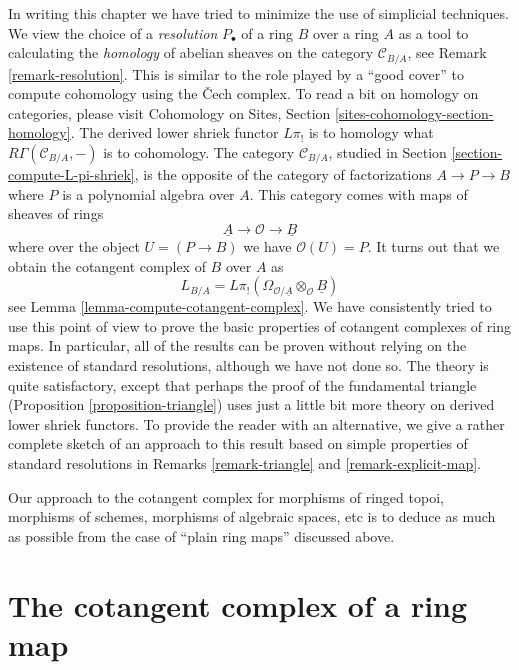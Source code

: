 \noindent
In writing this chapter we have tried to minimize
the use of simplicial techniques. We view the choice of a {\it resolution}
$P_\bullet$ of a ring $B$ over a ring $A$ as a tool to calculating the
{\it homology} of abelian sheaves on the category $\mathcal{C}_{B/A}$, see
Remark \ref{remark-resolution}. This is similar to the role played
by a ``good cover'' to compute cohomology using the {\v C}ech complex.
To read a bit on homology on categories, please visit
Cohomology on Sites, Section \ref{sites-cohomology-section-homology}.
The derived lower shriek functor $L\pi_!$ is to homology what
$R\Gamma(\mathcal{C}_{B/A}, -)$ is to cohomology. The category
$\mathcal{C}_{B/A}$, studied in Section \ref{section-compute-L-pi-shriek},
is the opposite of the category of factorizations $A \to P \to B$ where $P$
is a polynomial algebra over $A$. This category comes with maps of sheaves
of rings
$$
\underline{A} \longrightarrow \mathcal{O} \longrightarrow \underline{B}
$$
where over the object $U =  (P \to B)$ we have $\mathcal{O}(U) = P$. 
It turns out that we obtain the cotangent complex of $B$ over $A$ as
$$
L_{B/A} =
L\pi_!(\Omega_{\mathcal{O}/\underline{A}} \otimes_\mathcal{O} \underline{B})
$$
see Lemma \ref{lemma-compute-cotangent-complex}. We have consistently tried
to use this point of view to prove the basic properties of cotangent
complexes of ring maps. In particular, all of the results can be proven
without relying on the existence of standard resolutions, although we have
not done so. The theory is quite satisfactory, except that
perhaps the proof of the fundamental triangle
(Proposition \ref{proposition-triangle}) uses just a little
bit more theory on derived lower shriek functors.
To provide the reader with an alternative,
we give a rather complete sketch of an approach to this result
based on simple properties of standard resolutions in
Remarks \ref{remark-triangle} and \ref{remark-explicit-map}.

\medskip\noindent
Our approach to the cotangent complex for morphisms of ringed topoi,
morphisms of schemes, morphisms of algebraic spaces, etc
is to deduce as much as possible from the case of ``plain ring maps''
discussed above.





\section{The cotangent complex of a ring map}
\label{section-cotangent-ring-map}


